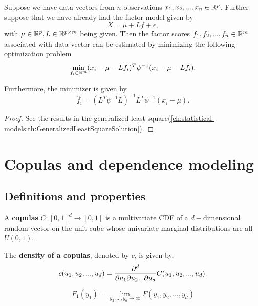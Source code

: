 \begin{refsection}
\begin{lemma}
Suppose we have data vectors from $n$ observations $x_1,x_2,...,x_n \in \mathbb{R}^p$. Further suppose that we have already had the factor model given by
$$X = \mu + Lf + \epsilon,$$
with $\mu\in \mathbb{R}^p, L\in \mathbb{R}^{p\times m}$ being given.
Then the factor scores $f_1,f_2,...,f_n \in \mathbb{R}^m$ associated with data vector can be estimated by minimizing the following optimization problem
$$\min_{f_i\in\mathbb{R}^m} (x_i - \mu - Lf_i)^T\psi^{-1}(x_i - \mu - Lf_i).$$

Furthermore, the minimizer is given by
$$\hat{f}_i = (L^T\psi^{-1}L)^{-1}L^T\psi^{-1}(x_i-\mu).$$
\end{lemma}
\begin{proof}
See the results in the generalized least square(\autoref{ch:statistical-models:th:GeneralizedLeastSquareSolution}).	
\end{proof}

\section{Copulas and dependence modeling}
\subsection{Definitions and properties}
\begin{definition}
A \textbf{copulas} $C:[0,1]^d\to [0,1]$ is a multivariate CDF of a $d-$dimensional random vector on the unit cube whose univariate marginal distributions are all $U(0,1)$.

The \textbf{density of a copulas}, denoted by $c$, is given by,
$$c(u_1,u_2,...,u_d) = \frac{\partial^d}{\partial u_1\partial u_2... \partial u_d}C(u_1,u_2,...,u_d).$$  
\end{definition}

\begin{note}
	
	$$F_1(y_1) = \lim_{y_2,...,y_d\to \infty} F(y_1,y_2,...,y_d)$$
\end{note}


\end{refsection}
